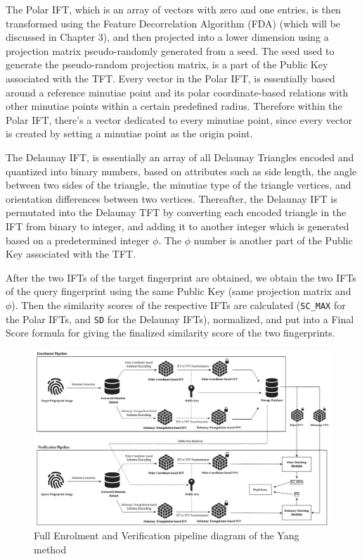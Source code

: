 \documentclass[fyp]{socreport}
\begin{document}
The Polar IFT, which is an array of vectors with zero and one entries, is then transformed using the Feature Decorrelation Algorithm (FDA) (which will be discussed in Chapter 3), and then projected into a lower dimension using a projection matrix pseudo-randomly generated from a seed. The seed used to generate the pseudo-random projection matrix, is a part of the Public Key associated with the TFT. Every vector in the Polar IFT, is essentially based around a reference minutiae point and its polar coordinate-based relations with other minutiae points within a certain predefined radius. Therefore within the Polar IFT, there's a vector dedicated to every minutiae point, since every vector is created by setting a minutiae point as the origin point.

The Delaunay IFT, is essentially an array of all Delaunay Triangles encoded and quantized into binary numbers, based on attributes such as side length, the angle between two sides of the triangle, the minutiae type of the triangle vertices, and orientation differences between two vertices. Thereafter, the Delaunay IFT is permutated into the Delaunay TFT by converting each encoded triangle in the IFT from binary to integer, and adding it to another integer which is generated based on a predetermined integer $\phi$. The $\phi$ number is another part of the Public Key associated with the TFT.

After the two IFTs of the target fingerprint are obtained, we obtain the two IFTs of the query fingerprint using the same Public Key (same projection matrix and $\phi$). Then the similarity scores of the respective IFTs are calculated (\texttt{SC\_MAX} for the Polar IFTs, and \texttt{SD} for the Delaunay IFTs), normalized, and put into a Final Score formula for giving the finalized similarity score of the two fingerprints.

\begin{figure}[H]
	\centering
	\includegraphics[width=1.1\textwidth]
	{Specific_Pipeline}
	\caption{Full Enrolment and Verification pipeline diagram of the Yang method}
\end{figure}
\end{document}
